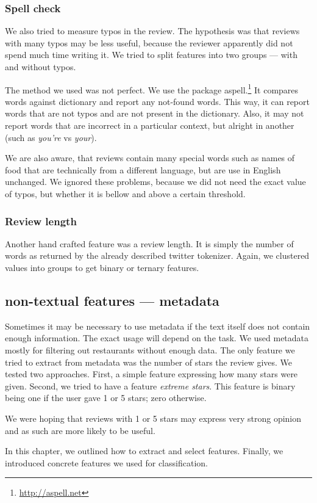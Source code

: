 \subsubsection{Spell check}

We also tried to measure typos in the review.
The hypothesis was that reviews with many typos may be less useful,
because the reviewer apparently did not spend much time writing it.
We tried to split features into two groups --- with and without typos.

The method we used was not perfect.
We use the package aspell.\footnote{\url{http://aspell.net}}
It compares words against dictionary and report any not-found words.
This way, it can report words that are not typos and are not present in the dictionary.
Also, it may not report words that are incorrect in a particular context,
but alright in another (such as \textit{you're} vs \textit{your}).

We are also aware, that reviews contain many special words such as names of food that
are technically from a different language, but are use in English unchanged.
We ignored these problems,
because we did not need the exact value of typos,
but whether it is bellow and above a certain threshold.


\subsubsection{Review length}

Another hand crafted feature was a review length.
It is simply the number of words as returned by the already described twitter tokenizer.
Again, we clustered values into groups to get binary or ternary features.


\subsection{non-textual features --- metadata}

Sometimes it may be necessary to use metadata
if the text itself does not contain enough information.
The exact usage will depend on the task.
We used metadata mostly for filtering out restaurants without enough data.
The only feature we tried to extract from metadata was the number of stars the review gives.
We tested two approaches.
First, a simple feature expressing how many stars were given.
Second, we tried to have a feature \textit{extreme stars}.
This feature is binary being one if the user gave 1 or 5 stars;
zero otherwise.

We were hoping that reviews with 1 or 5 stars may express very strong opinion
and as such are more likely to be useful.

In this chapter, we outlined how to extract and select features.
Finally, we introduced concrete features we used for classification.
